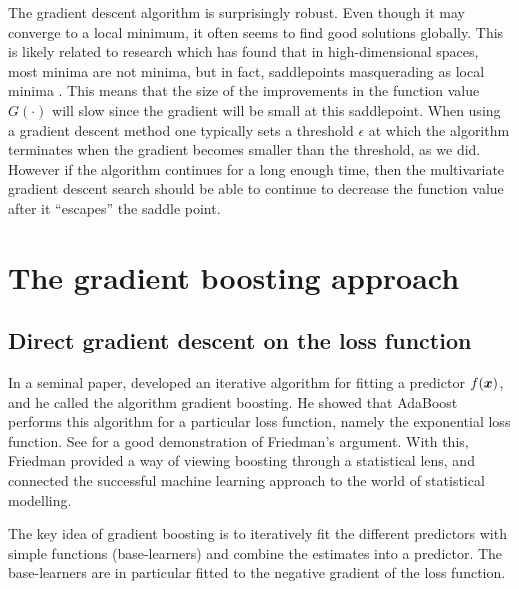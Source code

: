 The gradient descent algorithm is surprisingly robust.
Even though it may converge to a local minimum, it often seems to find good solutions globally.
This is likely related to research which has found that in high-dimensional spaces, most minima are not minima, but in fact, saddlepoints masquerading as local minima \citep{saddlepoints}.
This means that the size of the improvements in the function value $G(\cdot)$ will slow since the gradient will be small at this saddlepoint.
When using a gradient descent method one typically sets a threshold $\epsilon$ at which the algorithm terminates when the gradient becomes smaller than the threshold, as we did.
However if the algorithm continues for a long enough time, then the multivariate gradient descent search should be able to continue to decrease the function value after it ``escapes'' the saddle point.



\section{The gradient boosting approach}
\subsection{Direct gradient descent on the loss function}
In a seminal paper, \citet{friedman2001} developed an iterative algorithm for fitting a predictor $f(\bm{x})$, and he called the algorithm gradient boosting.
He showed that AdaBoost performs this algorithm for a particular loss function, namely the exponential loss function.
See \citet{ESL} for a good demonstration of Friedman's argument.
With this, Friedman provided a way of viewing boosting through a statistical lens, and connected the successful machine learning approach to the world of statistical modelling.

The key idea of gradient boosting is to iteratively fit the different predictors with simple functions (base-learners) and combine the estimates into a predictor.
The base-learners are in particular fitted to the negative gradient of the loss function.

